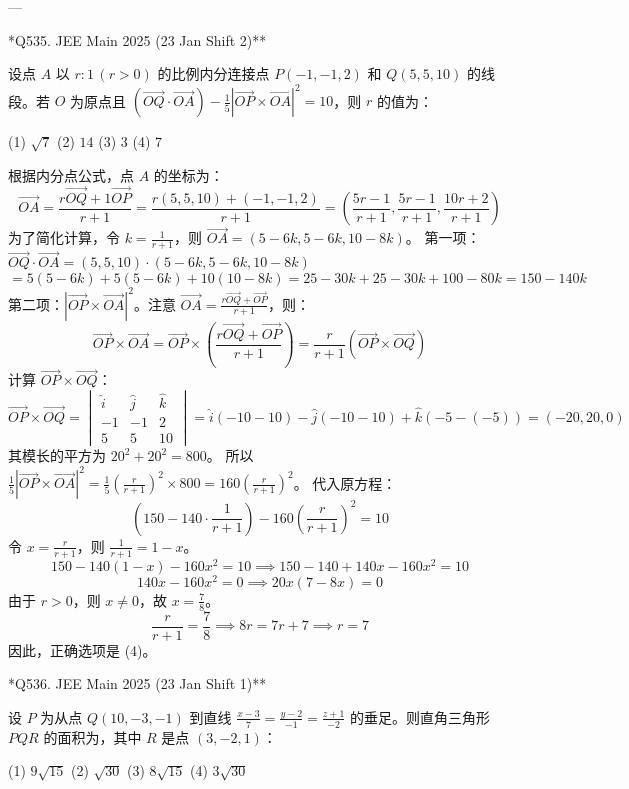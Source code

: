 \begin{questions}
---

\question **Q535. JEE Main 2025 (23 Jan Shift 2)**

设点 $A$ 以 $r : 1 \, (r > 0)$ 的比例内分连接点 $P(-1, -1, 2)$ 和 $Q(5, 5, 10)$ 的线段。若 $O$ 为原点且 $(\vec{OQ} \cdot \vec{OA}) - \frac{1}{5} |\vec{OP} \times \vec{OA}|^2 = 10$，则 $r$ 的值为：

(1) $\sqrt{7}$ \quad (2) $14$ \quad (3) $3$ \quad (4) $7$

\begin{solution}
根据内分点公式，点 $A$ 的坐标为：
\[
\vec{OA} = \frac{r\vec{OQ} + 1\vec{OP}}{r+1} = \frac{r(5, 5, 10) + (-1, -1, 2)}{r+1} = \left( \frac{5r-1}{r+1}, \frac{5r-1}{r+1}, \frac{10r+2}{r+1} \right)
\]
为了简化计算，令 $k = \frac{1}{r+1}$，则 $\vec{OA} = (5-6k, 5-6k, 10-8k)$。
第一项：$\vec{OQ} \cdot \vec{OA} = (5, 5, 10) \cdot (5-6k, 5-6k, 10-8k)$
\[
= 5(5-6k) + 5(5-6k) + 10(10-8k) = 25 - 30k + 25 - 30k + 100 - 80k = 150 - 140k
\]
第二项：$|\vec{OP} \times \vec{OA}|^2$。注意 $\vec{OA} = \frac{r\vec{OQ} + \vec{OP}}{r+1}$，则：
\[
\vec{OP} \times \vec{OA} = \vec{OP} \times \left( \frac{r\vec{OQ} + \vec{OP}}{r+1} \right) = \frac{r}{r+1} (\vec{OP} \times \vec{OQ})
\]
计算 $\vec{OP} \times \vec{OQ}$：
\[
\vec{OP} \times \vec{OQ} = \begin{vmatrix} \hat{i} & \hat{j} & \hat{k} \\ -1 & -1 & 2 \\ 5 & 5 & 10 \end{vmatrix} = \hat{i}(-10-10) - \hat{j}(-10-10) + \hat{k}(-5-(-5)) = (-20, 20, 0)
\]
其模长的平方为 $20^2 + 20^2 = 800$。
所以 $\frac{1}{5} |\vec{OP} \times \vec{OA}|^2 = \frac{1}{5} \left( \frac{r}{r+1} \right)^2 \times 800 = 160 \left( \frac{r}{r+1} \right)^2$。
代入原方程：
\[
(150 - 140 \cdot \frac{1}{r+1}) - 160 \left( \frac{r}{r+1} \right)^2 = 10
\]
令 $x = \frac{r}{r+1}$，则 $\frac{1}{r+1} = 1-x$。
\[
150 - 140(1-x) - 160x^2 = 10 \implies 150 - 140 + 140x - 160x^2 = 10
\]
\[
140x - 160x^2 = 0 \implies 20x(7 - 8x) = 0
\]
由于 $r > 0$，则 $x \neq 0$，故 $x = \frac{7}{8}$。
\[
\frac{r}{r+1} = \frac{7}{8} \implies 8r = 7r + 7 \implies r = 7
\]
因此，正确选项是 (4)。
\end{solution}

\question **Q536. JEE Main 2025 (23 Jan Shift 1)**

设 $P$ 为从点 $Q(10, -3, -1)$ 到直线 $\frac{x-3}{7} = \frac{y-2}{-1} = \frac{z+1}{-2}$ 的垂足。则直角三角形 $PQR$ 的面积为，其中 $R$ 是点 $(3, -2, 1)$：

(1) $9\sqrt{15}$ \quad (2) $\sqrt{30}$ \quad (3) $8\sqrt{15}$ \quad (4) $3\sqrt{30}$


\end{questions}
